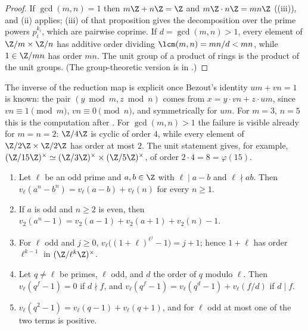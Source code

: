 \begin{proof}
If $\gcd(m,n)=1$ then $m\Z+n\Z=\Z$ and $m\Z\cdot n\Z=mn\Z$ ((iii)), and (ii) applies; (iii) of that
proposition gives the decomposition over the prime powers $p_i^{k_i}$, which are pairwise coprime. If $d=\gcd(m,n)>1$, every element
of $\Z/m\times\Z/n$ has additive order dividing $\lcm(m,n)=mn/d<mn$, while $1\in\Z/mn$ has order $mn$. The unit group of a product of
rings is the product of the unit groups. (The group-theoretic version is in .)
\end{proof}

The inverse of the reduction map is explicit once Bezout's identity $um+vn=1$ is known: the pair $(y\bmod m,z\bmod n)$ comes from
$x=y\cdot vn+z\cdot um$, since $vn\equiv1\pmod m$, $vn\equiv0\pmod n$, and symmetrically for $um$. For $m=3$, $n=5$ this is the computation after
. For $\gcd(m,n)>1$ the failure is visible already for $m=n=2$: $\Z/4\Z$ is cyclic of order $4$, while every element of
$\Z/2\Z\times\Z/2\Z$ has order at most $2$. The unit statement gives, for example, $(\Z/15\Z)^\times\simeq(\Z/3\Z)^\times\times(\Z/5\Z)^\times$, of order $2\cdot4=8=\varphi(15)$.

\begin{lemma}\label{lem:rings:lte}
\begin{enumerate}[label=(\roman*)]
\item Let $\ell$ be an odd prime and $a,b\in\Z$ with $\ell\mid a-b$ and $\ell\nmid ab$. Then $v_\ell(a^n-b^n)=v_\ell(a-b)+v_\ell(n)$ for every $n\ge1$.
\item If $a$ is odd and $n\ge2$ is even, then $v_2(a^n-1)=v_2(a-1)+v_2(a+1)+v_2(n)-1$.
\item For $\ell$ odd and $j\ge0$, $v_\ell\bigl((1+\ell)^{\ell^j}-1\bigr)=j+1$; hence $1+\ell$ has order $\ell^{k-1}$ in $(\Z/\ell^k\Z)^\times$.
\item Let $q\ne\ell$ be primes, $\ell$ odd, and $d$ the order of $q$ modulo $\ell$. Then $v_\ell(q^f-1)=0$ if $d\nmid f$, and
$v_\ell(q^f-1)=v_\ell(q^d-1)+v_\ell(f/d)$ if $d\mid f$.
\item $v_\ell(q^2-1)=v_\ell(q-1)+v_\ell(q+1)$, and for $\ell$ odd at most one of the two terms is positive.
\end{enumerate}
\end{lemma}

